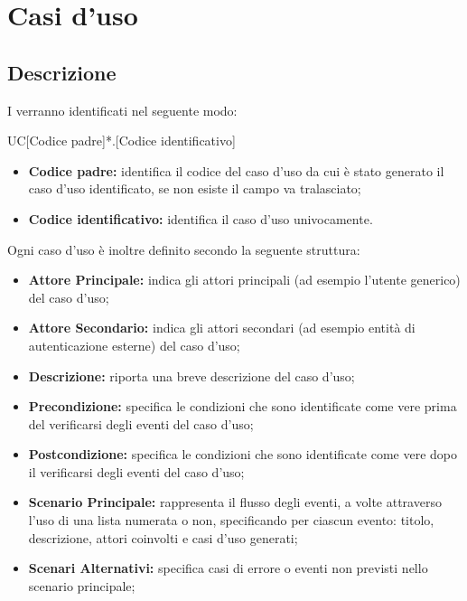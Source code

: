 \documentclass[../AnalisideiRequisiti.tex]{subfiles}
\begin{document}

	\chapter{Casi d'uso}
	\section{Descrizione}
	I  verranno identificati nel seguente modo: 
	
	\begin{center}
		UC[Codice padre]*.[Codice identificativo]
	\end{center}
	
	\begin{itemize}
		\item \textbf{Codice padre:} identifica il codice del caso d'uso da cui è stato generato il caso d'uso identificato, se non esiste il campo va tralasciato;
		\item \textbf{Codice identificativo:} identifica il caso d'uso univocamente.
	\end{itemize}
	
	\noindent Ogni caso d'uso è inoltre definito secondo la seguente struttura:
	\begin{itemize}
		\item \textbf{Attore Principale:} indica gli attori principali (ad esempio l'utente generico) del caso d'uso;
		\item \textbf{Attore Secondario:} indica gli attori secondari (ad esempio entità di autenticazione esterne) del caso d'uso;
		\item \textbf{Descrizione:} riporta una breve descrizione del caso d'uso;
		\item \textbf{Precondizione:} specifica le condizioni che sono identificate come vere prima del verificarsi degli eventi del caso d'uso;
		\item \textbf{Postcondizione:} specifica le condizioni che sono identificate come vere dopo il verificarsi degli eventi del caso d'uso;
		\item \textbf{Scenario Principale:} rappresenta il flusso degli eventi, a volte attraverso l'uso di una lista numerata o non, specificando per ciascun evento: titolo, descrizione, attori coinvolti e casi d'uso generati;
		\item \textbf{Scenari Alternativi:} specifica casi di errore o eventi non previsti nello scenario principale;
		
	\end{itemize}
\end{document}
